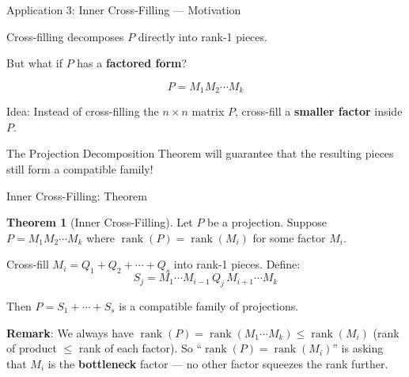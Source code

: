 \documentclass[10pt]{beamer}
\theoremstyle{definition}
\newtheorem{thm}{Theorem}[section]
\newcommand{\x}[1]{\alert{\textbf{#1}}}
\begin{document}
\begin{frame}{Application 3: Inner Cross-Filling --- Motivation}

Cross-filling decomposes $P$ directly into rank-1 pieces.

\vspace{0.5em}

But what if $P$ has a \x{factored form}?

$$P = M_1 M_2 \cdots M_k$$

\vspace{0.5em}

Idea: Instead of cross-filling the $n \times n$ matrix $P$, cross-fill a \x{smaller factor} inside $P$.

\vspace{0.5em}

The Projection Decomposition Theorem will guarantee that the resulting pieces still form a compatible family!

\end{frame}


\begin{frame}{Inner Cross-Filling: Theorem}

\begin{thm}[Inner Cross-Filling]
Let $P$ be a projection. Suppose $P = M_1 M_2 \cdots M_k$ where $\operatorname{rank}(P) = \operatorname{rank}(M_i)$ for some factor $M_i$.

Cross-fill $M_i = Q_1 + Q_2 + \cdots + Q_s$ into rank-1 pieces. Define:
$$S_j = M_1 \cdots M_{i-1} \, Q_j \, M_{i+1} \cdots M_k$$

Then $P = S_1 + \cdots + S_s$ is a compatible family of projections.
\end{thm}

\vspace{0.3em}

\textbf{Remark}: We always have $\operatorname{rank}(P) = \operatorname{rank}(M_1 \cdots M_k) \leq \operatorname{rank}(M_i)$ (rank of product $\leq$ rank of each factor). So ``$\operatorname{rank}(P) = \operatorname{rank}(M_i)$'' is asking that $M_i$ is the \x{bottleneck} factor --- no other factor squeezes the rank further.

\end{frame}
\end{document}
